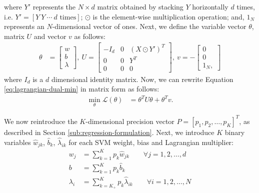 \documentclass[12pt]{article}
\numberwithin{equation}{section}
\begin{document}
where $Y'$ represents the $N \times d$ matrix obtained by stacking $Y$ horizontally $d$ times, i.e. $Y' = [Y \ Y \ \cdots \ d\text{ times}]$;
$\odot$ is the element-wise multiplication operation;
and, $1_N$ represents an $N$-dimensional vector of ones.
Next, we define the variable vector $\theta$, matrix $U$ and vector $v$ as follows:
\begin{align}
    \theta &=   \begin{bmatrix}
                    w \\ b \\ \lambda
                \end{bmatrix}, \
    U =    \begin{bmatrix}
                -I_d & 0 & (X \odot Y')^T \\
                0   & 0 & Y^T \\
                0   & 0 & 0
            \end{bmatrix}, \
    v =    -\begin{bmatrix}
                0 \\ 0 \\ 1_N,
            \end{bmatrix} \label{eq:svm-theta-U-v}
\end{align}
where $I_d$ is a $d$ dimensional identity matrix.
Now, we can rewrite Equation \ref{eq:lagrangian-dual-min} in matrix form as follows:
\begin{align}
    \min_{\theta} \mathcal{L}(\theta) &= \theta^T U \theta + \theta^T v. \label{eq:lagrangian-dual-matrix}
\end{align}

We now reintroduce the $K$-dimensional precision vector $P = [p_1, p_2, \ldots, p_K]^T$, as described in Section \ref{sub:regression-formulation}.
Next, we introduce $K$ binary variables $\hat{w}_{jk}$, $\hat{b}_{k}$, $\hat{\lambda}_{ik}$ for each SVM weight, bias and Lagrangian multiplier:
\begin{align}
    w_{j} &= \sum_{k=1}^K p_k \hat{w}_{jk} \qquad \forall j = 1, 2, \ldots, d \label{eq:binarized-svm-weights} \\
    b &= \sum_{k=1}^K p_k \hat{b}_{k} \label{eq:binarized-svm-bias} \\
    \lambda_i &= \sum_{k=K_+}^K p_k \hat{\lambda}_{ik} \qquad \forall i = 1, 2, \ldots, N \label{eq:binarized-svm-lagrange-multipliers}
\end{align}
\end{document}
